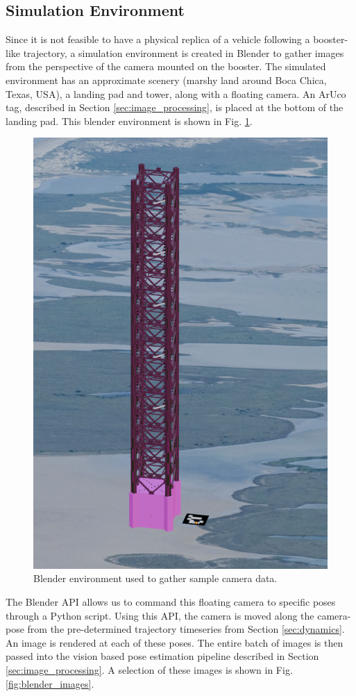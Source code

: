 \documentclass[conference]{IEEEtran}
\begin{document}
\subsection{Simulation Environment}
Since it is not feasible to have a physical replica of a vehicle following a booster-like trajectory, a simulation environment is created in Blender to gather images from the perspective of the camera mounted on the booster. The simulated environment has an approximate scenery (marshy land around Boca Chica, Texas, USA), a landing pad and tower, along with a floating camera. An ArUco tag, described in Section \ref{sec:image_processing}, is placed at the bottom of the landing pad. This blender environment is shown in Fig. \ref{fig:blender_env}.

\begin{figure}[htbp] \label{fig:blender_env}
    \centering
    \includegraphics[width=.3\textwidth]{blender_env.png}\hfill
    \caption{Blender environment used to gather sample camera data.}
\end{figure}

The Blender API allows us to command this floating camera to specific poses through a Python script. Using this API, the camera is moved along the camera-pose from the pre-determined trajectory timeseries from Section \ref{sec:dynamics}. An image is rendered at each of these poses. The entire batch of images is then passed into the vision based pose estimation pipeline described in Section \ref{sec:image_processing}. A selection of these images is shown in Fig. \ref{fig:blender_images}.
\end{document}
